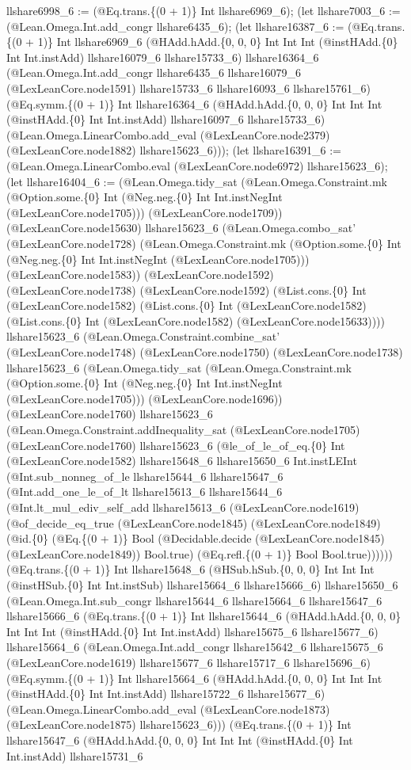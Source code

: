 \documentclass[11pt]{article}
\begin{document}
llshare6998\_6 := (@Eq.trans.\{(0 + 1)\} Int llshare6969\_6); (let llshare7003\_6 := (@Lean.Omega.Int.add\_congr llshare6435\_6); (let llshare16387\_6 := (@Eq.trans.\{(0 + 1)\} Int llshare6969\_6 (@HAdd.hAdd.\{0, 0, 0\} Int Int Int (@instHAdd.\{0\} Int Int.instAdd) llshare16079\_6 llshare15733\_6) llshare16364\_6 (@Lean.Omega.Int.add\_congr llshare6435\_6 llshare16079\_6 (@LexLeanCore.node1591) llshare15733\_6 llshare16093\_6 llshare15761\_6) (@Eq.symm.\{(0 + 1)\} Int llshare16364\_6 (@HAdd.hAdd.\{0, 0, 0\} Int Int Int (@instHAdd.\{0\} Int Int.instAdd) llshare16097\_6 llshare15733\_6) (@Lean.Omega.LinearCombo.add\_eval (@LexLeanCore.node2379) (@LexLeanCore.node1882) llshare15623\_6))); (let llshare16391\_6 := (@Lean.Omega.LinearCombo.eval (@LexLeanCore.node6972) llshare15623\_6); (let llshare16404\_6 := (@Lean.Omega.tidy\_sat (@Lean.Omega.Constraint.mk (@Option.some.\{0\} Int (@Neg.neg.\{0\} Int Int.instNegInt (@LexLeanCore.node1705))) (@LexLeanCore.node1709)) (@LexLeanCore.node15630) llshare15623\_6 (@Lean.Omega.combo\_sat' (@LexLeanCore.node1728) (@Lean.Omega.Constraint.mk (@Option.some.\{0\} Int (@Neg.neg.\{0\} Int Int.instNegInt (@LexLeanCore.node1705))) (@LexLeanCore.node1583)) (@LexLeanCore.node1592) (@LexLeanCore.node1738) (@LexLeanCore.node1592) (@List.cons.\{0\} Int (@LexLeanCore.node1582) (@List.cons.\{0\} Int (@LexLeanCore.node1582) (@List.cons.\{0\} Int (@LexLeanCore.node1582) (@LexLeanCore.node15633)))) llshare15623\_6 (@Lean.Omega.Constraint.combine\_sat' (@LexLeanCore.node1748) (@LexLeanCore.node1750) (@LexLeanCore.node1738) llshare15623\_6 (@Lean.Omega.tidy\_sat (@Lean.Omega.Constraint.mk (@Option.some.\{0\} Int (@Neg.neg.\{0\} Int Int.instNegInt (@LexLeanCore.node1705))) (@LexLeanCore.node1696)) (@LexLeanCore.node1760) llshare15623\_6 (@Lean.Omega.Constraint.addInequality\_sat (@LexLeanCore.node1705) (@LexLeanCore.node1760) llshare15623\_6 (@le\_of\_le\_of\_eq.\{0\} Int (@LexLeanCore.node1582) llshare15648\_6 llshare15650\_6 Int.instLEInt (@Int.sub\_nonneg\_of\_le llshare15644\_6 llshare15647\_6 (@Int.add\_one\_le\_of\_lt llshare15613\_6 llshare15644\_6 (@Int.lt\_mul\_ediv\_self\_add llshare15613\_6 (@LexLeanCore.node1619) (@of\_decide\_eq\_true (@LexLeanCore.node1845) (@LexLeanCore.node1849) (@id.\{0\} (@Eq.\{(0 + 1)\} Bool (@Decidable.decide (@LexLeanCore.node1845) (@LexLeanCore.node1849)) Bool.true) (@Eq.refl.\{(0 + 1)\} Bool Bool.true)))))) (@Eq.trans.\{(0 + 1)\} Int llshare15648\_6 (@HSub.hSub.\{0, 0, 0\} Int Int Int (@instHSub.\{0\} Int Int.instSub) llshare15664\_6 llshare15666\_6) llshare15650\_6 (@Lean.Omega.Int.sub\_congr llshare15644\_6 llshare15664\_6 llshare15647\_6 llshare15666\_6 (@Eq.trans.\{(0 + 1)\} Int llshare15644\_6 (@HAdd.hAdd.\{0, 0, 0\} Int Int Int (@instHAdd.\{0\} Int Int.instAdd) llshare15675\_6 llshare15677\_6) llshare15664\_6 (@Lean.Omega.Int.add\_congr llshare15642\_6 llshare15675\_6 (@LexLeanCore.node1619) llshare15677\_6 llshare15717\_6 llshare15696\_6) (@Eq.symm.\{(0 + 1)\} Int llshare15664\_6 (@HAdd.hAdd.\{0, 0, 0\} Int Int Int (@instHAdd.\{0\} Int Int.instAdd) llshare15722\_6 llshare15677\_6) (@Lean.Omega.LinearCombo.add\_eval (@LexLeanCore.node1873) (@LexLeanCore.node1875) llshare15623\_6))) (@Eq.trans.\{(0 + 1)\} Int llshare15647\_6 (@HAdd.hAdd.\{0, 0, 0\} Int Int Int (@instHAdd.\{0\} Int Int.instAdd) llshare15731\_6 
\end{document}
